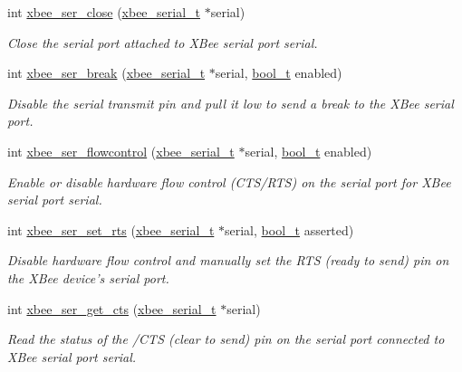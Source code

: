 \begin{DoxyCompactItemize}
int \hyperlink{group__xbee__serial_ga48b9d743a446074ea6abacd0de24044d}{xbee\-\_\-ser\-\_\-close} (\hyperlink{structxbee__serial__t}{xbee\-\_\-serial\-\_\-t} $\ast$serial)
\begin{DoxyCompactList}\small\item\em Close the serial port attached to X\-Bee serial port {\itshape serial}. \end{DoxyCompactList}\item 
int \hyperlink{group__xbee__serial_gae19aa61eec588d1b935d267b0a982319}{xbee\-\_\-ser\-\_\-break} (\hyperlink{structxbee__serial__t}{xbee\-\_\-serial\-\_\-t} $\ast$serial, \hyperlink{group__hal_ga04dd5074964518403bf944f2b240a5f8}{bool\-\_\-t} enabled)
\begin{DoxyCompactList}\small\item\em Disable the serial transmit pin and pull it low to send a break to the X\-Bee serial port. \end{DoxyCompactList}\item 
int \hyperlink{group__xbee__serial_ga33229d0d63ff1442f23b0739794d3afb}{xbee\-\_\-ser\-\_\-flowcontrol} (\hyperlink{structxbee__serial__t}{xbee\-\_\-serial\-\_\-t} $\ast$serial, \hyperlink{group__hal_ga04dd5074964518403bf944f2b240a5f8}{bool\-\_\-t} enabled)
\begin{DoxyCompactList}\small\item\em Enable or disable hardware flow control (C\-T\-S/\-R\-T\-S) on the serial port for X\-Bee serial port {\itshape serial}. \end{DoxyCompactList}\item 
int \hyperlink{group__xbee__serial_gad1b1f9f42e58d8299ddcca1c9cb3c5e8}{xbee\-\_\-ser\-\_\-set\-\_\-rts} (\hyperlink{structxbee__serial__t}{xbee\-\_\-serial\-\_\-t} $\ast$serial, \hyperlink{group__hal_ga04dd5074964518403bf944f2b240a5f8}{bool\-\_\-t} asserted)
\begin{DoxyCompactList}\small\item\em Disable hardware flow control and manually set the R\-T\-S (ready to send) pin on the X\-Bee device's serial port. \end{DoxyCompactList}\item 
int \hyperlink{group__xbee__serial_ga894f6fadc890b5ba5ce32338f0acd217}{xbee\-\_\-ser\-\_\-get\-\_\-cts} (\hyperlink{structxbee__serial__t}{xbee\-\_\-serial\-\_\-t} $\ast$serial)
\begin{DoxyCompactList}\small\item\em Read the status of the /\-C\-T\-S (clear to send) pin on the serial port connected to X\-Bee serial port {\itshape serial}. \end{DoxyCompactList}\end{DoxyCompactItemize}


